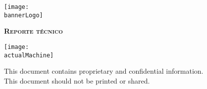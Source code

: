 \begin{titlepage}
    \centering
    \texttt{[image: \\bannerLogo]}\par\vspace{0.5cm}
    {\scshape\LARGE \textbf{Reporte técnico}}\par\vspace{0.3cm}
    {\Huge \bfseries \textcolor{greenBanner}{\productToTestName}}\par\vspace{1cm}
    \vfill
    \vfill
    \texttt{[image: \\actualMachine]}\par\vspace{1cm}
    \vfill
    \begin{tcolorbox}[colback=red!5!white,colframe=red!75!black]
        \centering
        This document contains proprietary and confidential information.\\
        This document should not be printed or shared.
    \end{tcolorbox}
    \vfill
    {\large \startDate}\par
    \vfill
    \clearpage
\end{titlepage}
